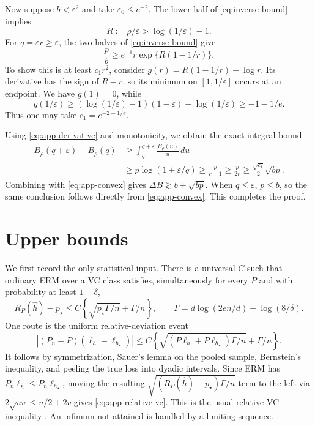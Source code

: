 \documentclass{article}
\theoremstyle{remark}
\newcommand{\eps}{\varepsilon}
\begin{document}
Now suppose $b<\eps^2$ and take $\eps_0\le e^{-2}$.  The lower half of \eqref{eq:inverse-bound} implies \[ R:=\rho/\eps>\log(1/\eps)-1. \] For $q=\eps r\ge\eps$, the two halves of \eqref{eq:inverse-bound} give \[ \frac pb\ge e^{-1}r\exp\{R(1-1/r)\}. \] To show this is at least $c_1r^2$, consider $g(r)=R(1-1/r)-\log r$.  Its derivative has the sign of $R-r$, so its minimum on $[1,1/\eps]$ occurs at an endpoint.  We have $g(1)=0$, while \[ g(1/\eps)\ge(\log(1/\eps)-1)(1-\eps)-\log(1/\eps) \ge-1-1/e. \] Thus one may take $c_1=e^{-2-1/e}$.

Using \eqref{eq:app-derivative} and monotonicity, we obtain the exact integral bound
\begin{align*}
 B_\rho(q+\eps)-B_\rho(q)
 &\ge\int_q^{q+\eps}\frac{B_\rho(u)}u\,du\\
 &\ge p\log(1+\eps/q)
 \ge\frac{p}{r+1}\ge\frac{p}{2r}
 \ge\frac{\sqrt{c_1}}2\sqrt{bp}.
\end{align*}
Combining with \eqref{eq:app-convex} gives $\Delta B\gtrsim b+\sqrt{bp}$.  When $q\le\eps$, $p\le b$, so the same conclusion follows directly from \eqref{eq:app-convex}.  This completes the proof.

\section{Upper bounds}
\label{app:upper}

We first record the only statistical input.  There is a universal $C$ such that ordinary ERM over a VC class satisfies, simultaneously for every $P$ and with probability at least $1-\delta$,
\begin{equation}
 R_P(\widehat h)-p_\star
 \le C\left\{\sqrt{p_\star\Gamma/n}+\Gamma/n\right\},
 \qquad
 \Gamma=d\log(2en/d)+\log(8/\delta).
 \label{eq:app-relative-vc}
\end{equation}
One route is the uniform relative-deviation event \[ |(P_n-P)(\ell_h-\ell_{h_\star})| \le C\left\{\sqrt{(P\ell_h+P\ell_{h_\star})\Gamma/n} +\Gamma/n\right\}. \] It follows by symmetrization, Sauer's lemma on the pooled sample, Bernstein's inequality, and peeling the true loss into dyadic intervals.  Since ERM has $P_n\ell_{\widehat h}\le P_n\ell_{h_\star}$, moving the resulting $\sqrt{(R_P(\widehat h)-p_\star)\Gamma/n}$ term to the left via $2\sqrt{uv}\le u/2+2v$ gives \eqref{eq:app-relative-vc}.  This is the usual relative VC inequality \citep{vapnik1971uniform,boucheron2005classification}. An infimum not attained is handled by a limiting sequence.
\end{document}
